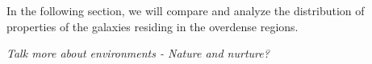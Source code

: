 \documentclass[twocolumn,useAMS,usenatbib]{mn2e}
\begin{document}
In the following section, we will compare and analyze the distribution of properties of the galaxies residing in the overdense regions.

%

\emph{Talk more about environments - Nature and nurture?}

\end{document}
